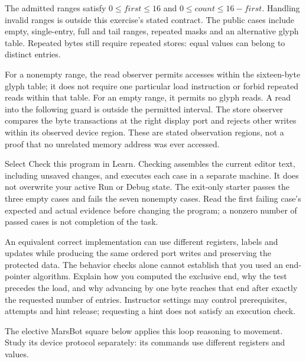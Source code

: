 The admitted ranges satisfy $0 \leq \mathit{first} \leq 16$ and
$0 \leq \mathit{count} \leq 16-\mathit{first}$. Handling invalid ranges is outside
this exercise's stated contract. The public cases include empty, single-entry,
full and tail ranges, repeated masks and an alternative glyph table. Repeated
bytes still require repeated stores: equal values can belong to distinct entries.

For a nonempty range, the read observer permits accesses within the sixteen-byte
glyph table; it does not require one particular load instruction or forbid
repeated reads within that table. For an empty range, it permits no glyph reads.
A read into the following guard is outside the permitted interval. The store
observer compares the byte transactions at the right display port and rejects
other writes within its observed device region. These are stated observation
regions, not a proof that no unrelated memory address was ever accessed.

Select Check this program in Learn. Checking assembles the current editor text,
including unsaved changes, and executes each case in a separate machine. It does
not overwrite your active Run or Debug state. The exit-only starter passes the
three empty cases and fails the seven nonempty cases. Read the first failing
case's expected and actual evidence before changing the program; a nonzero
number of passed cases is not completion of the task.

An equivalent correct implementation can use different registers, labels and
updates while producing the same ordered port writes and preserving the protected
data. The behavior checks alone cannot establish that you used an end-pointer
algorithm. Explain how you computed the exclusive end, why the test precedes the
load, and why advancing by one byte reaches that end after exactly the requested
number of entries. Instructor settings may control prerequisites, attempts and
hint release; requesting a hint does not satisfy an execution check.

The elective MarsBot square below applies this loop reasoning to movement.
Study its device protocol separately: its commands use different registers
and values.


